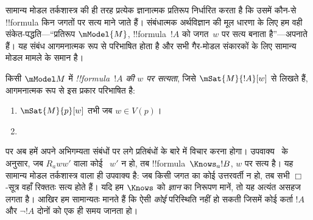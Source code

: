 \documentclass[../../../include/open-logic-section]{subfiles}
\begin{document}


सामान्य मोडल तर्कशास्त्र की ही तरह प्रत्येक ज्ञानात्मक प्रतिरूप निर्धारित
करता है कि उसमें कौन-से !!{formula} किन जगतों पर सत्य माने जाते हैं।
संबंधात्मक अर्थविज्ञान की मूल धारणा के लिए हम वही संकेत-पद्धति---``प्रतिरूप
$\mModel{M}$, !!{formula}~$!A$ को जगत~$w$ पर सत्य बनाता है''---अपनाते हैं।
यह संबंध आगमनात्मक रूप से परिभाषित होता है और सभी गैर-मोडल संकारकों के लिए
सामान्य मोडल मामले के समान है।

\begin{defn}
  किसी $\mModel M$ में \emph{!!{formula}~$!A$ की $w$ पर सत्यता}, जिसे
  $\mSat{M}{!A}[w]$ से लिखते हैं, आगमनात्मक रूप से इस प्रकार परिभाषित है:
  \begin{enumerate}
  \item $\mSat{M}{p}[w]$ तभी जब $w \in V(p)$।
  \item{}
  \end{enumerate} 
\end{defn}

पर अब हमें अपने अभिगम्यता संबंधों पर लगे प्रतिबंधों के बारे में विचार करना
होगा। उपवाक्य~ के अनुसार, जब $R_a ww'$ वाला कोई
~$w'$ न हो, तब !!{formula}~$\Knows_a !B$, $w$ पर सत्य है। यह सामान्य मोडल
तर्कशास्त्र वाला ही उपवाक्य है: जब किसी जगत का कोई उत्तरवर्ती न हो, तब सभी
$\Box$-सूत्र वहाँ रिक्ततः सत्य होते हैं। यदि हम $\Knows$ को \emph{ज्ञान}
का निरूपण मानें, तो यह अत्यंत असहज लगता है। आखिर हम सामान्यतः मानते हैं कि
ऐसी \emph{कोई} परिस्थिति नहीं हो सकती जिसमें कोई कर्ता $!A$ और $\lnot !A$
दोनों को एक ही समय जानता हो।
\end{document}
